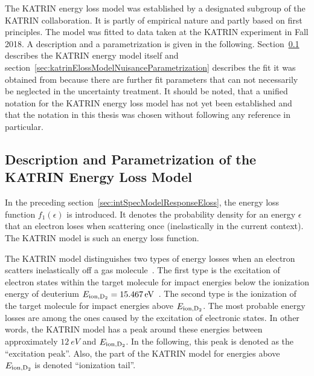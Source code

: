 The KATRIN energy loss model was established by a designated subgroup of the KATRIN collaboration. It is partly of empirical nature and partly based on first principles. The model was fitted to data taken at the KATRIN experiment in Fall 2018. A description and a parametrization is given in the following. Section~\ref{sec:katrinElossModelMainParametrization} describes the KATRIN energy model itself and section~\ref{sec:katrinElossModelNuisanceParametrization} describes the fit it was obtained from because there are further fit parameters that can not necessarily be neglected in the uncertainty treatment. It should be noted, that a unified notation for the KATRIN energy loss model has not yet been established and that the notation in this thesis was chosen without following any reference in particular.

\subsection{Description and Parametrization of the KATRIN Energy Loss Model}
\label{sec:katrinElossModelMainParametrization}
In the preceding section~\ref{sec:intSpecModelResponseEloss}, the energy loss function $f_1(\epsilon)$ is introduced. It denotes the probability density for an energy $\epsilon$ that an electron loses when scattering once (inelastically in the current context). The KATRIN model is such an energy loss function.

The KATRIN model distinguishes two types of energy losses when an electron scatters inelastically off a gas molecule~\cite{Hannen2019_2}. The first type is the excitation of electron states within the target molecule for impact energies below the ionization energy of deuterium $E_\mathrm{ion,D_2}=\SI{15.467}{eV}$~\cite{Shiner1993}. The second type is the ionization of the target molecule for impact energies above $E_\mathrm{ion,D_2}$. The most probable energy losses are among the ones caused by the excitation of electronic states. In other words, the KATRIN model has a peak around these energies between approximately $\SI{12}{eV}$ and $E_\mathrm{ion,D_2}$. In the following, this peak is denoted as the ``excitation peak''. Also, the part of the KATRIN model for energies above $E_\mathrm{ion,D_2}$ is denoted ``ionization tail''.

